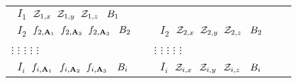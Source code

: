 \documentclass[10pt]{report}
\begin{document}
\begin{itemize}
\begin{center}
\begin{tabular}{p{0.4\linewidth}p{0.4\linewidth}}
        {\tt \hspace{0.2cm} $I_{1}$\hspace{0.3cm}  $ \mathcal{Z}_{1,x} \hspace{0.2cm} \mathcal{Z}_{1,y} \hspace{0.2cm} \mathcal{Z}_{1,z}\hspace{0.3cm} B_{1} $}  \\
        {\tt \hspace{0.2cm} $I_{2}$\hspace{0.3cm}  $ f_{2,\textbf{A}_1} \hspace{0.2cm} f_{2,\textbf{A}_2} \hspace{0.2cm} f_{2,\textbf{A}_3} \hspace{0.3cm} B_{2} $}  &
        {\tt \hspace{0.2cm} $I_{2}$\hspace{0.3cm}  $ \mathcal{Z}_{2,x} \hspace{0.2cm} \mathcal{Z}_{2,y} \hspace{0.2cm} \mathcal{Z}_{2,z}\hspace{0.3cm} B_{2} $}  \\
           \hspace{0.3cm}  $\vdots$ \hspace{0.9cm}    $\vdots$ \hspace{0.45cm} $\vdots$ \hspace{0.45cm} $\vdots$ \hspace{0.55cm} $\vdots$             &   
           \hspace{0.3cm}  $\vdots$ \hspace{0.9cm}    $\vdots$ \hspace{0.45cm} $\vdots$ \hspace{0.55cm} $\vdots$ \hspace{0.4cm} $\vdots$ \\
        {\tt \hspace{0.2cm} $I_{i}$\hspace{0.35cm}  $ f_{i,\textbf{A}_1} \hspace{0.25cm} f_{i,\textbf{A}_2} \hspace{0.2cm} f_{i,\textbf{A}_3} \hspace{0.35cm} B_{i} $}  &
        {\tt \hspace{0.2cm} $I_{i}$\hspace{0.35cm}  $ \mathcal{Z}_{i,x} \hspace{0.25cm} \mathcal{Z}_{i,y} \hspace{0.25cm} \mathcal{Z}_{i,z}\hspace{0.35cm} B_{i} $}  \\

\end{tabular}
\end{center}
\end{itemize}
\end{document}
